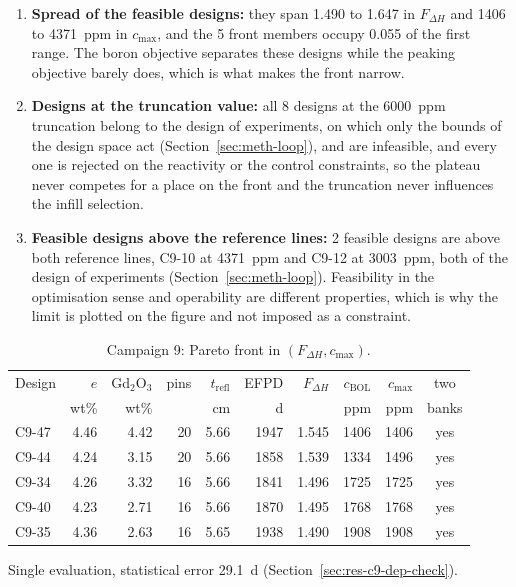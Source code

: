 \begin{enumerate}
  \item \textbf{Spread of the feasible designs:} they span 1.490 to 1.647 in
        $F_{\Delta H}$ and 1406 to \SI{4371}{ppm} in $c_\mathrm{max}$, and
        the 5 front members occupy 0.055 of the first range. The boron
        objective separates these designs while the peaking objective
        barely does, which is what makes the front narrow.

  \item \textbf{Designs at the truncation value:} all 8 designs
        at the \SI{6000}{ppm} truncation belong to the design of
        experiments, on which only the bounds of the design space act
        (Section~\ref{sec:meth-loop}), and are infeasible, and every one is rejected on the
        reactivity or the control constraints, so the plateau never
        competes for a place on the front and the truncation never influences the infill selection.

  \item \textbf{Feasible designs above the reference lines:} 2
        feasible designs are above both reference lines, C9-10 at
        \SI{4371}{ppm} and C9-12 at \SI{3003}{ppm}, both of the design
        of experiments (Section~\ref{sec:meth-loop}). Feasibility in the
        optimisation sense and operability are different properties, which
        is why the limit is plotted on the figure and not imposed as a
        constraint.
\end{enumerate}

\begin{table}[!htb]
  \centering
  \begin{threeparttable}
  \caption{Campaign 9: Pareto front in $(F_{\Delta H}, c_\mathrm{max})$.}
  \label{tab:c9-front}
  \small
  \begin{tabular}{@{}lrrrrrrrrc@{}}
    \toprule
    Design & $e$ & Gd$_2$O$_3$ & pins & $t_\mathrm{refl}$ & EFPD\tnote{a} &
    $F_{\Delta H}$ & $c_\mathrm{BOL}$ & $c_\mathrm{max}$ & two \\
     & wt\% & wt\% & & cm & d & & ppm & ppm & banks \\
    \midrule
    C9-47 & 4.46 & 4.42 & 20 & 5.66 & 1947 & 1.545 & 1406 & 1406 & yes \\
    C9-44 & 4.24 & 3.15 & 20 & 5.66 & 1858 & 1.539 & 1334 & 1496 & yes \\
    C9-34 & 4.26 & 3.32 & 16 & 5.66 & 1841 & 1.496 & 1725 & 1725 & yes \\
    C9-40 & 4.23 & 2.71 & 16 & 5.66 & 1870 & 1.495 & 1768 & 1768 & yes \\
    C9-35 & 4.36 & 2.63 & 16 & 5.65 & 1938 & 1.490 & 1908 & 1908 & yes \\
    \bottomrule
  \end{tabular}
  \begin{tablenotes}[flushleft]\footnotesize
    \item[a] Single evaluation, statistical error \SI{29.1}{d}
      (Section~\ref{sec:res-c9-dep-check}).
  \end{tablenotes}
  \end{threeparttable}
\end{table}

